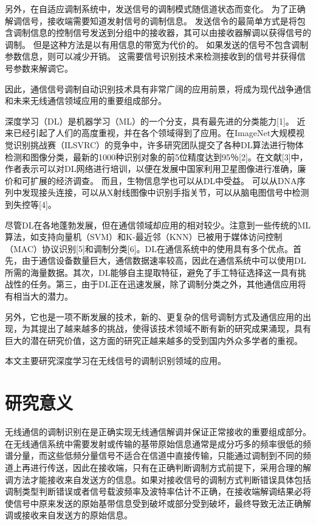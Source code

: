 另外，在自适应调制系统中，发送信号的调制模式随信道状态而变化。 为了正确解调信号，接收端需要知道发射信号的调制信息。 发送信令的最简单方式是将包含调制信息的控制信号发送到分组中的接收器，其可以由接收器解调以获得信号的调制。 但是这种方法是以有用信息的带宽为代价的。 如果发送的信号不包含调制参数信息，则可以减少开销。 这需要信号识别技术来检测接收到的信号并获得信号参数来解调它。\par

因此，通信信号调制自动识别技术具有非常广阔的应用前景，将成为现代战争通信和未来无线通信领域应用的重要组成部分。\par

深度学习（DL）是机器学习（ML）的一个分支，具有最先进的分类能力[1]。 近来已经引起了人们的高度重视，并在各个领域得到了应用。在ImageNet大规模视觉识别挑战赛（ILSVRC）的竞争中，许多研究团队提交了各种DL算法进行物体检测和图像分类，最新的1000种识别对象的前5位精度达到95％[2]。在文献[3]中，作者表示可以对DL网络进行培训，以便在发展中国家利用卫星图像进行准确，廉价和可扩展的经济调查。 而且，生物信息学也可以从DL中受益。 可以从DNA序列中发现接头连接，可以从X射线图像中识别手指关节，可以从脑电图信号中检测到失控等[4]。\par

尽管DL在各地蓬勃发展，但在通信领域却应用的相对较少。注意到一些传统的ML算法，如支持向量机（SVM）和K-最近邻（KNN）已被用于媒体访问控制（MAC）协议识别[5]和调制分类[6]。DL在通信系统中的使用具有多个优点。首先，由于通信设备数量巨大，通信数据速率较高，因此在通信系统中可以使用DL所需的海量数据。其次，DL能够自主提取特征，避免了手工特征选择这一具有挑战性的任务。第三，由于DL正在迅速发展，除了调制分类之外，其他通信应用将有相当大的潜力。\par

另外，它也是一项不断发展的技术，新的、更复杂的信号调制方式及通信应用的出现，为其提出了越来越多的挑战，使得该技术领域不断有新的研究成果涌现，具有巨大的潜在研究价值，这方面的研究正越来越多的受到国内外众多学者的重视。\par

本文主要研究深度学习在无线信号的调制识别领域的应用。\par


\section{研究意义}

无线通信的调制识别在是正确实现无线通信解调并保证正常接收的重要组成部分。在无线通信系统中需要发射或传输的基带原始信息通常是成分巧多的频率很低的频谱分量，而这些低频分量信号不适合在信道中直接传输，只能通过调制到不同的频道上再进行传送，因此在接收端，只有在正确判断调制方式前提下，采用合理的解调方法才能接收来自发送方的信息。如果对接收信号的调制方式判断错误具体包括调制类型判断错误或者信号载波频率及波特率估计不正确，在接收端解调结果必将使信号中原来发送的原始基带信息受到破坏或部分受到破坏，最终导致无法正确解调或接收来自发送方的原始信息。\par


